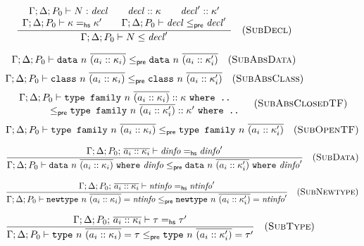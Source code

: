 \begin{figure}


\[
\frac{
\begin{array}{c}
\Gamma; \Delta; P_0 \vdash N : \mathit{decl} \qquad
\mathit{decl} :: \kappa \qquad
\mathit{decl}' :: \kappa' \\
\Gamma; \Delta; P_0 \vdash \kappa =_\mathsf{hs} \kappa' \qquad
\Gamma; \Delta; P_0 \vdash \mathit{decl} \le_\textsf{pre} \mathit{decl}'
\end{array}
}{
\Gamma; \Delta; P_0 \vdash N \le \mathit{decl}'
}
\quad(\textsc{SubDecl})
\]


\[
\Gamma; \Delta; P_0 \vdash \texttt{data}~n~\overline{(a_i :: \kappa_i)} \le_\textsf{pre} \texttt{data}~n~\overline{(a_i :: \kappa'_i)}
\quad(\textsc{SubAbsData})
\]
\[
\Gamma; \Delta; P_0 \vdash \texttt{class}~n~\overline{(a_i :: \kappa_i)} \le_\textsf{pre} \texttt{class}~n~\overline{(a_i :: \kappa'_i)}
\quad(\textsc{SubAbsClass})
\]
\[
\begin{array}{c}
\Gamma; \Delta; P_0 \vdash \texttt{type family}~n~\overline{(a_i :: \kappa_i)} :: \kappa ~\texttt{where ..} \\
\qquad\qquad\le_\textsf{pre} \texttt{type family}~n~\overline{(a_i :: \kappa'_i)} :: \kappa' ~\texttt{where ..}
\end{array}
\quad(\textsc{SubAbsClosedTF})
\]
\[
\Gamma; \Delta; P_0 \vdash \texttt{type family}~n~\overline{(a_i :: \kappa_i)} \le_\textsf{pre} \texttt{type family}~n~\overline{(a_i :: \kappa'_i)}
\quad(\textsc{SubOpenTF})
\]


\[
\frac{
\Gamma; \Delta; P_0;\, \overline{a_i :: \kappa_i} \vdash \mathit{dinfo} =_\textsf{hs} \mathit{dinfo}'
}{
\Gamma; \Delta; P_0 \vdash \texttt{data}~n~\overline{(a_i :: \kappa_i)} ~\texttt{where}~ \mathit{dinfo} \le_\textsf{pre} \texttt{data}~n~\overline{(a_i :: \kappa'_i)} ~\texttt{where}~ \mathit{dinfo}'
}
\quad(\textsc{SubData})
\]

\[
\frac{
\Gamma; \Delta; P_0;\, \overline{a_i :: \kappa_i} \vdash \mathit{ntinfo} =_\textsf{hs} \mathit{ntinfo}'
}{
\Gamma; \Delta; P_0 \vdash \texttt{newtype}~n~\overline{(a_i :: \kappa_i)} = \mathit{ntinfo} \le_\textsf{pre} \texttt{newtype}~n~\overline{(a_i :: \kappa'_i)} = \mathit{ntinfo}'
}
\quad(\textsc{SubNewtype})
\]

\[
\frac{
\Gamma; \Delta; P_0;\, \overline{a_i :: \kappa_i} \vdash \tau =_\textsf{hs} \tau'
}{
\Gamma; \Delta; P_0 \vdash \texttt{type}~n~\overline{(a_i :: \kappa_i)} = \tau \le_\textsf{pre} \texttt{type}~n~\overline{(a_i :: \kappa'_i)} = \tau'
}
\quad(\textsc{SubType})
\]


\end{figure}
